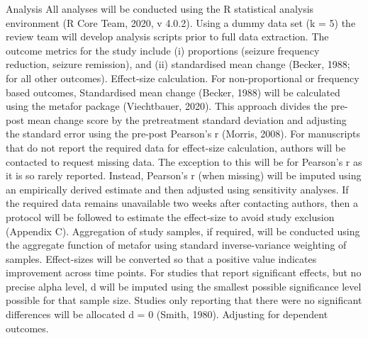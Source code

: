 \documentclass[
  12pt,
  openany]{book}
\begin{document}
Analysis
All analyses will be conducted using the R statistical analysis environment (R Core Team, 2020, v 4.0.2). Using a dummy data set (k = 5) the review team will develop analysis scripts prior to full data extraction. The outcome metrics for the study include (i) proportions (seizure frequency reduction, seizure remission), and (ii) standardised mean change (Becker, 1988; for all other outcomes).
Effect-size calculation.
For non-proportional or frequency based outcomes, Standardised mean change (Becker, 1988) will be calculated using the metafor package (Viechtbauer, 2020). This approach divides the pre-post mean change score by the pretreatment standard deviation and adjusting the standard error using the pre-post Pearson's r (Morris, 2008). For manuscripts that do not report the required data for effect-size calculation, authors will be contacted to request missing data. The exception to this will be for Pearson's r as it is so rarely reported. Instead, Pearson's r (when missing) will be imputed using an empirically derived estimate and then adjusted using sensitivity analyses.
If the required data remains unavailable two weeks after contacting authors, then a protocol will be followed to estimate the effect-size to avoid study exclusion (Appendix C). Aggregation of study samples, if required, will be conducted using the aggregate function of metafor using standard inverse-variance weighting of samples. Effect-sizes will be converted so that a positive value indicates improvement across time points. For studies that report significant effects, but no precise alpha level, d will be imputed using the smallest possible significance level possible for that sample size. Studies only reporting that there were no significant differences will be allocated d = 0 (Smith, 1980).
Adjusting for dependent outcomes.
\end{document}
